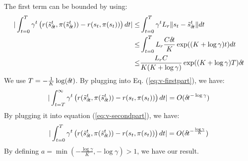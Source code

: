 The first term can be bounded by using:
\begin{align}
  | \int_{t=0}^T\gamma^t \left(r(\tilde s_{\delta\hspace{-.1em}t}^t, \pi(\tilde s_{\delta\hspace{-.1em}t}^t)) - r(s_t, \pi(s_t)) \right)dt | \leq& \int_{t=0}^T\gamma^t L_r \| s_t - \tilde s_{\delta\hspace{-.1em}t}^t \| dt \\
  \leq& \int_{t=0}^T L_r \frac{C {\delta\hspace{-.1em}t}}{K} \exp((K + \log \gamma)t ) dt \\
  \leq&  \frac{L_r C}{K(K + \log \gamma)}\exp((K + \log \gamma)T ) {\delta\hspace{-.1em}t}
   \label{eq:v-secondpart}
\end{align}
We use $T = -\frac{1}{K}\log({\delta\hspace{-.1em}t})$. By plugging into Eq. (\ref{eq:v-firstpart}), we have:
\begin{align}
	| \int_{t=T}^\infty\gamma^t \left(r(\tilde s_{\delta\hspace{-.1em}t}^t, \pi(\tilde s_{\delta\hspace{-.1em}t}^t)) - r(s_t, \pi(s_t)) \right)dt | = O( {\delta\hspace{-.1em}t}^{-\log\gamma})
\end{align}
By plugging it into equation (\ref{eq:v-secondpart}), we have:
\begin{align}
  | \int_{t=0}^T\gamma^t \left(r(\tilde s_{\delta\hspace{-.1em}t}^t, \pi(\tilde s_{\delta\hspace{-.1em}t}^t)) - r(s_t, \pi(s_t)) \right)dt | = O( {\delta\hspace{-.1em}t}^{-\frac{\log\gamma}{K}})
\end{align}
By defining $a = \min(-\frac{\log\gamma}{K}, -\log\gamma) > 1$, we have our result.

